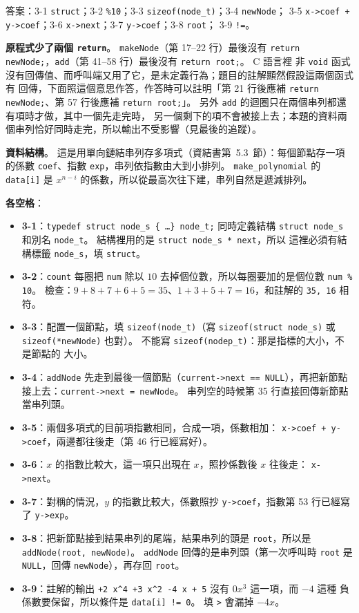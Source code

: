 \begin{pastsoln}
答案：3-1 \texttt{struct}；3-2 \texttt{\%10}；3-3 \texttt{sizeof(node\_t)}；3-4 \texttt{newNode}；
3-5 \texttt{x->coef + y->coef}；3-6 \texttt{x->next}；3-7 \texttt{y->coef}；3-8 \texttt{root}；
3-9 \texttt{!=}。

\textbf{原程式少了兩個 \texttt{return}}。 \texttt{makeNode}（第 17--22 行）最後沒有
\texttt{return newNode;}，\texttt{add}（第 41--58 行）最後沒有 \texttt{return root;}。 C 語言裡
非 \texttt{void} 函式沒有回傳值、而呼叫端又用了它，是未定義行為；題目的註解顯然假設這兩個函式有
回傳，下面照這個意思作答，作答時可以註明「第 21 行後應補 \texttt{return newNode;}、第 57 行後應補
\texttt{return root;}」。 另外 \texttt{add} 的迴圈只在兩個串列都還有項時才做，其中一個先走完時，
另一個剩下的項不會被接上去；本題的資料兩個串列恰好同時走完，所以輸出不受影響（見最後的追蹤）。

\textbf{資料結構}。 這是用單向鏈結串列存多項式（資結書第~5.3~節）：每個節點存一項的係數
\texttt{coef}、指數 \texttt{exp}，串列依指數由大到小排列。 \texttt{make\_polynomial} 的
\texttt{data[i]} 是 $x^{n-i}$ 的係數，所以從最高次往下建，串列自然是遞減排列。

\textbf{各空格}：
\begin{itemize}
\item \textbf{3-1}：\texttt{typedef struct node\_s \{ \ldots \} node\_t;} 同時定義結構
\texttt{struct node\_s} 和別名 \texttt{node\_t}。 結構裡用的是 \texttt{struct node\_s * next}，所以
這裡必須有結構標籤 \texttt{node\_s}，填 \texttt{struct}。
\item \textbf{3-2}：\texttt{count} 每圈把 \texttt{num} 除以 $10$ 去掉個位數，所以每圈要加的是個位數
\texttt{num \% 10}。 檢查：$9 + 8 + 7 + 6 + 5 = 35$、$1 + 3 + 5 + 7 = 16$，和註解的
\texttt{35, 16} 相符。
\item \textbf{3-3}：配置一個節點，填 \texttt{sizeof(node\_t)}（寫 \texttt{sizeof(struct node\_s)}
或 \texttt{sizeof(*newNode)} 也對）。 不能寫 \texttt{sizeof(nodep\_t)}：那是指標的大小，不是節點的
大小。
\item \textbf{3-4}：\texttt{addNode} 先走到最後一個節點（\texttt{current->next == NULL}），再把新節點
接上去：\texttt{current->next = newNode}。 串列空的時候第 35 行直接回傳新節點當串列頭。
\item \textbf{3-5}：兩個多項式的目前項指數相同，合成一項，係數相加：
\texttt{x->coef + y->coef}，兩邊都往後走（第 46 行已經寫好）。
\item \textbf{3-6}：$x$ 的指數比較大，這一項只出現在 $x$，照抄係數後 $x$ 往後走：
\texttt{x->next}。
\item \textbf{3-7}：對稱的情況，$y$ 的指數比較大，係數照抄 \texttt{y->coef}，指數第 53 行已經寫了
\texttt{y->exp}。
\item \textbf{3-8}：把新節點接到結果串列的尾端，結果串列的頭是 \texttt{root}，所以是
\texttt{addNode(root, newNode)}。 \texttt{addNode} 回傳的是串列頭（第一次呼叫時 \texttt{root} 是
\texttt{NULL}，回傳 \texttt{newNode}），再存回 \texttt{root}。
\item \textbf{3-9}：註解的輸出 \texttt{+2 x\^{}4 +3 x\^{}2 -4 x + 5} 沒有 $0x^3$ 這一項，而 $-4$ 這種
負係數要保留，所以條件是 \texttt{data[i] != 0}。 填 \texttt{>} 會漏掉 $-4x$。
\end{itemize}


\end{pastsoln}
